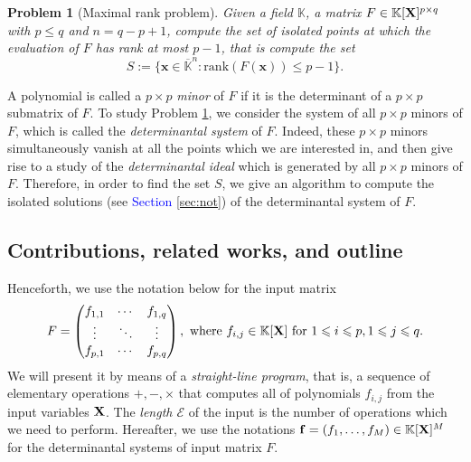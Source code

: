 \documentclass[11pt]{article}
\newtheorem{pbm}{Problem}
\numberwithin{Property}{section}
\numberwithin{Theorem}{section}
\numberwithin{Proposition}{section}
\numberwithin{Lemma}{section}
\numberwithin{Corollary}{section}
\numberwithin{Definition}{section}
\numberwithin{Remark}{section}
\numberwithin{Conjecture}{section}
\numberwithin{Problem}{section}
\numberwithin{Claim}{section}
\theoremstyle{definition}
\numberwithin{Example}{section}
\def\f {\ensuremath{\mathbf{f}}}
\renewcommand{\leq}{\leqslant}
\def\bar{\overline}
\newcommand{\field}{\mathbb{K}} %
\newcommand{\mat}[1]{\mathbf{\MakeUppercase{#1}}} %
\newcommand{\improve}[1]{\textcolor{blue}{#1}} %
\begin{document}
\begin{pbm}[Maximal rank problem] \label{problem} Given a field $\field$, a matrix $F \in \field[\mat{X}]^{p \times q}$ with $p \leq q$ and $n = q-p+1$, compute the set of isolated points at which the evaluation of $F$ has rank at most $p-1$, that is compute the set
\[S := \{\mathbf{x} \in \bar{\field}^n : \mathrm{rank}(F({\mathbf{x}})) \leq p - 1 \}.\]
\end{pbm}

A polynomial is called a $p \times p$ \emph{minor} of $F$ if it is the determinant of a $p \times p$ submatrix of $F$. To study Problem \ref{problem}, we consider the system of all $p \times p$ minors of $F$, which is called  the \emph{determinantal system} of $F$. Indeed, these $p \times p$ minors simultaneously vanish at all the points which we are interested in, and then give rise to a study of the \emph{determinantal ideal} which is generated by all $p \times p$ minors of $F$. Therefore, in order to find the set $S$, we give an algorithm to compute the isolated solutions (see \improve{Section \ref{sec:not}}) of the determinantal system of $F$. 
\subsection{Contributions, related works, and outline}
Henceforth, we use the notation below for the input matrix
\[ F = 
\left( \begin{matrix}
f_{1,1} & \cdots & f_{1,q}\\
\vdots & \ddots & \vdots \\
f_{p,1} & \cdots & f_{p,q}
\end{matrix} \right), \ \mathrm{where} \ f_{i,j} \in \field[\mat{X}] \ \mathrm{for} \ 1 \leq i \leq p, 1 \leq j \leq q.
\]
We will present it by means of a \emph{straight-line program}, that is, a sequence of elementary operations $+, -, \times$ that computes all of polynomials $f_{i,j}$ from the input variables $\mat{X}$. The \emph{length $\mathcal{E}$} of the input is the number of operations which we need to perform. Hereafter, we use the notations $\f = (f_1, \ldots, f_M) \in \field[\mat{X}]^M$ for the determinantal systems of input matrix $F$. 
\end{document}
